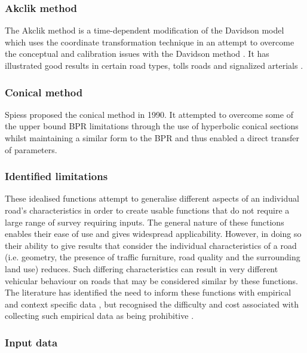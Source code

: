 \documentclass{CUP-JNL-DCE}
\begin{document}
\subsubsection{Akclik method}

The Akclik method is a time-dependent modification of the Davidson model which uses the coordinate transformation technique in an attempt to overcome the conceptual and calibration issues with the Davidson method \citep{akcelik1991travel}. It has illustrated good results in certain road types, tolls roads and signalized arterials \citep{mtoi2014calibration}. 

\subsubsection{Conical method}

Spiess \citep{spiess1990technical} proposed the conical method in 1990. It attempted to overcome some of the upper bound BPR limitations through the use of hyperbolic conical sections whilst maintaining a similar form to the BPR and thus enabled a direct transfer of parameters.

\subsubsection{Identified limitations}

These idealised functions attempt to generalise different aspects of an individual road's characteristics in order to create usable functions that do not require a large range of survey requiring inputs. The general nature of these functions enables their ease of use and gives widespread applicability. However, in doing so their ability to give results that consider the individual characteristics of a road (i.e. geometry, the presence of traffic furniture, road quality and the surrounding land use) reduces. Such differing characteristics can result in very different vehicular behaviour on roads that may be considered similar by these functions. The literature has identified the need to inform these functions with empirical and context specific data \citep{rose1989estimating}, \citep{spiess1990technical} but recognised the difficulty and cost associated with collecting such empirical data as being prohibitive \citep{rose1989estimating}.

\subsubsection{Input data}
\end{document}
